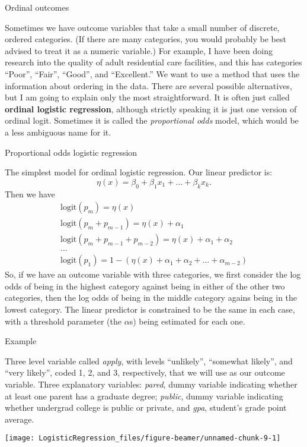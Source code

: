 \documentclass[10pt,ignorenonframetext,]{beamer}
\begin{document}
\begin{frame}{Ordinal outcomes}

Sometimes we have outcome variables that take a small number of
discrete, ordered categories. (If there are many categories, you would
probably be best advised to treat it as a numeric variable.) For
example, I have been doing research into the quality of adult
residential care facilities, and this has categories ``Poor'', ``Fair'',
``Good'', and ``Excellent.'' We want to use a method that uses the
information about ordering in the data. There are several possible
alternatives, but I am going to explain only the most straightforward.
It is often just called \textbf{ordinal logistic regression}, although
strictly speaking it is just one version of ordinal logit. Sometimes it
is called the \emph{proportional odds} model, which would be a less
ambiguous name for it.

\end{frame}

\begin{frame}{Proportional odds logistic regression}

The simplest model for ordinal logistic regression. Our linear predictor
is: \[
\eta(x) = \beta_0 + \beta_1 x_1 + \dots + \beta_k x_k.
\] Then we have \[
\begin{gathered}
\text{logit}(p_m) = \eta(x) \\
\text{logit}(p_m + p_{m-1}) = \eta(x) + \alpha_1 \\
\text{logit}(p_m + p_{m-1} + p_{m-2}) = \eta(x) + \alpha_1 + \alpha_2 \\
\dots \\
\text{logit}(p_1) = 1 - (\eta(x) + \alpha_1 + \alpha_2 + \dots + \alpha_{m-2})
\end{gathered}
\] So, if we have an outcome variable with three categories, we first
consider the log odds of being in the highest category against being in
either of the other two categories, then the log odds of being in the
middle category agains being in the lowest category. The linear
predictor is constrained to be the same in each case, with a threshold
parameter (the \(\alpha\)s) being estimated for each one.

\end{frame}

\begin{frame}{Example}

Three level variable called \emph{apply}, with levels ``unlikely'',
``somewhat likely'', and ``very likely'', coded 1, 2, and 3,
respectively, that we will use as our outcome variable. Three
explanatory variables: \emph{pared}, dummy variable indicating whether
at least one parent has a graduate degree; \emph{public}, dummy variable
indicating whether undergrad college is public or private, and
\emph{gpa}, student's grade point average.

\begin{center}\texttt{[image: LogisticRegression\_files/figure-beamer/unnamed-chunk-9-1]} \end{center}

\end{frame}
\end{document}
